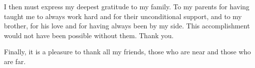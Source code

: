 \documentclass[12pt,titlepage]{article}
\theoremstyle{plain}
\theoremstyle{remark}
\begin{document}
I then must express my deepest gratitude to my family. To my parents for having taught me to always work hard and for their unconditional support, and to my brother, for his love and for having always been by my side. This accomplishment would not have been possible without them. Thank you.

Finally, it is a pleasure to thank all my friends, those who are near and those who are far. 


\pagebreak
\null
\newpage
\pagebreak


\tableofcontents

\pagebreak



\pagebreak



\pagebreak



\pagebreak



\pagebreak




\pagebreak
{\small } 
\nocite{*}
\pagebreak




\pagebreak
\end{document}
